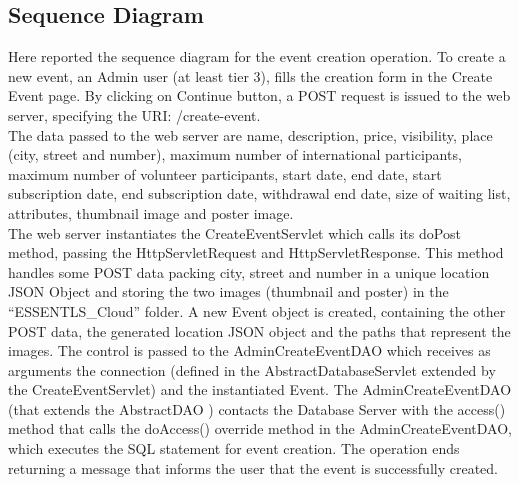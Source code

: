 \subsection{Sequence Diagram}


Here reported the sequence diagram for the event creation operation.
To create a new event, an Admin user (at least tier 3), fills the creation form in the Create Event page.
By clicking on Continue button, a POST request is issued to the web server, specifying the URI: /create-event. \\
The data passed to the web server are name, description, price, visibility, place (city, street and number),
maximum number of international participants, maximum number of volunteer participants, start date, end date,
start subscription date, end subscription date, withdrawal end date, size of waiting list, attributes,
thumbnail image and poster image. \\
The web server instantiates the CreateEventServlet which calls its doPost method, passing the HttpServletRequest
and HttpServletResponse. This method handles some POST data packing city, street and number in a unique location JSON
Object and storing the two images (thumbnail and poster) in the “ESSENTLS_Cloud” folder.
A new Event object is created, containing the other POST data, the generated location JSON object and the paths that
represent the images. The control is passed to the AdminCreateEventDAO which receives as arguments the connection
(defined in the AbstractDatabaseServlet extended by the CreateEventServlet) and the instantiated Event.
The AdminCreateEventDAO (that extends the AbstractDAO ) contacts the Database Server with the access() method that
calls the doAccess() override method in the AdminCreateEventDAO, which executes the SQL statement for event creation.
The operation ends returning a message that informs the user that the event is successfully created.